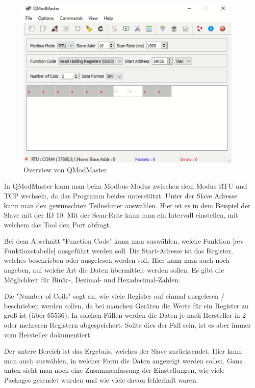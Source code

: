\begin{figure}[h t] 
    \centering
    \includegraphics[scale=0.7]{pics/QmodMasterverview.png}
    \caption{Overview von QModMaster }
    \label{fig:impl:QmodMasterverview}
\end{figure}


In QModMaster kann man beim Modbus-Modus zwischen dem Modus RTU und TCP wechseln, da das Programm beides unterstützt. Unter der Slave Adresse kann man den gewünschten Teilnehmer auswählen. Hier ist es in dem Beispiel der Slave mit der ID 10. Mit der Scan-Rate kann man ein Intervall einstellen, mit welchem das Tool den Port abfragt.   

Bei dem Abschnitt "Function Code" kann man auswählen, welche Funktion [rev Funktionstabelle] ausgeführt werden soll. Die Start-Adresse ist das Register, welches beschrieben oder ausgelesen werden soll. Hier kann man auch noch angeben, auf welche Art die Daten übermittelt werden sollen. Es gibt die Möglichkeit für Binär-, Dezimal- und Hexadecimal-Zahlen. 

Die "Number of Coils" sagt an, wie viele Register auf einmal ausgelesen / beschrieben werden sollen, da bei manchen Geräten die Werte für ein Register zu groß ist (über 65536). In solchen Fällen werden die Daten je nach Hersteller in 2 oder mehreren Registern abgespeichert. Sollte dies der Fall sein, ist es aber immer vom Hersteller dokumentiert.   

Der untere Bereich ist das Ergebnis, welches der Slave zurücksendet. Hier kann man auch auswählen, in welcher Form die Daten angezeigt werden sollen. Ganz unten sieht man noch eine Zusammenfassung der Einstellungen, wie viele Packages gesendet wurden und wie viele davon fehlerhaft waren.   

